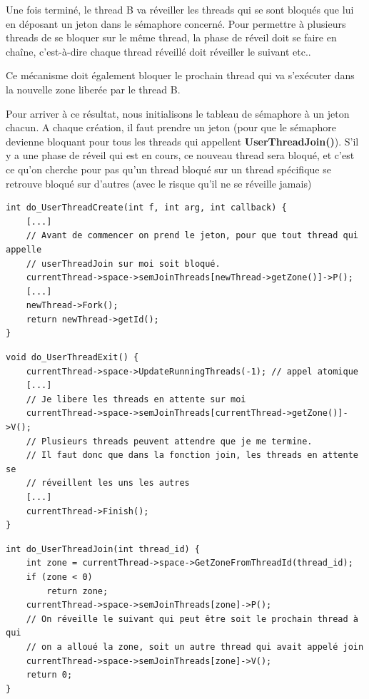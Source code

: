 \documentclass[a4paper,10pt]{article}
\begin{document}
Une fois terminé, le thread B va réveiller les threads qui se sont bloqués que
lui en déposant un jeton dans le sémaphore concerné.
Pour permettre à plusieurs threads de se bloquer sur le même thread, la phase
de réveil doit se faire en chaîne, c'est-à-dire chaque thread réveillé doit
réveiller le suivant etc..

Ce mécanisme doit également bloquer le prochain thread qui va s'exécuter dans
la nouvelle zone liberée par le thread B.

Pour arriver à ce résultat, nous initialisons le tableau de sémaphore à un jeton
chacun. A chaque création, il faut prendre un jeton (pour que le sémaphore
devienne bloquant pour tous les threads qui appellent \textbf{UserThreadJoin()}).
S'il y a une phase de réveil qui est en cours, ce nouveau thread sera bloqué,
et c'est ce qu'on cherche pour pas qu'un thread bloqué sur un thread spécifique
se retrouve bloqué sur d'autres (avec le risque qu'il ne se réveille jamais)

\begin{lstlisting}
int do_UserThreadCreate(int f, int arg, int callback) {
    [...]
    // Avant de commencer on prend le jeton, pour que tout thread qui appelle
    // userThreadJoin sur moi soit bloqué.
    currentThread->space->semJoinThreads[newThread->getZone()]->P();
    [...]
    newThread->Fork();
    return newThread->getId();
}
\end{lstlisting}

\begin{lstlisting}
void do_UserThreadExit() {
    currentThread->space->UpdateRunningThreads(-1); // appel atomique
    [...]
    // Je libere les threads en attente sur moi
    currentThread->space->semJoinThreads[currentThread->getZone()]->V();
    // Plusieurs threads peuvent attendre que je me termine.
    // Il faut donc que dans la fonction join, les threads en attente se
    // réveillent les uns les autres
    [...]
    currentThread->Finish();
}
\end{lstlisting}

\begin{lstlisting}
int do_UserThreadJoin(int thread_id) {
    int zone = currentThread->space->GetZoneFromThreadId(thread_id);
    if (zone < 0)
        return zone;
    currentThread->space->semJoinThreads[zone]->P();
    // On réveille le suivant qui peut être soit le prochain thread à qui
    // on a alloué la zone, soit un autre thread qui avait appelé join
    currentThread->space->semJoinThreads[zone]->V();
    return 0;
}
\end{lstlisting}
\end{document}
